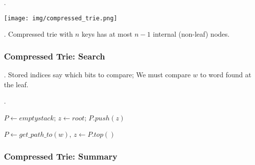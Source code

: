 \documentclass{article}
\begin{document}
\begin{examplee}[].
    \begin{center}
        \texttt{[image: img/compressed\_trie.png]}
    \end{center}
\end{examplee}

\begin{thmm}[].
    Compressed trie with $n$ keys has at most $n -1$ internal (non-leaf) nodes. 
\end{thmm}

\subsubsection{Compressed Trie: Search} 

\begin{comm}[].
    Stored indices say which bits to compare; 
    We must compare $w$ to word found at the leaf. 
\end{comm} 

\begin{codes}[].
    \begin{algorithm}[H]
        \DontPrintSemicolon 
        \BlankLine
        
        $P \leftarrow empty stack$; \quad $z \leftarrow root$; \quad $P.push(z)$ \; 
        \caption{}
    \end{algorithm}
    \begin{algorithm}[H]
        \DontPrintSemicolon 
        \BlankLine
        
        $P \leftarrow get\_path\_to(w)$, \quad $z \leftarrow P.top()$ \;
        \caption{}
    \end{algorithm}
\end{codes}

\subsubsection{Compressed Trie: Summary}
\end{document}
